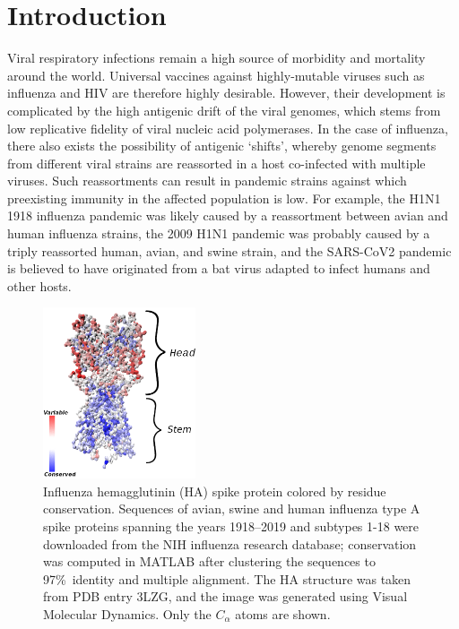 \documentclass[utf8]{frontiersHLTH}%
\newcommand{\cred}[1]{\textsf{\color{red}#1}}
\begin{document}
\section{Introduction}
\label{sec:introduction}
Viral respiratory infections remain a high source of morbidity and
mortality around the world. Universal vaccines against highly-mutable
viruses such as influenza and HIV are therefore highly desirable.
However, their development is complicated by the high antigenic drift of
the viral genomes, which stems from low replicative fidelity of viral
nucleic acid polymerases.  In the case of influenza, there also exists the possibility of antigenic `shifts',
whereby genome segments from different viral strains are
reassorted in a host co-infected with multiple viruses.
Such reassortments can result in pandemic strains against which preexisting immunity
in the affected population is low.
For example, the H1N1 1918 influenza pandemic was likely caused by a reassortment
between avian and human influenza strains, the 2009 H1N1 pandemic was probably
caused by a triply reassorted human, avian, and swine strain,\cite{taubenberger19} and the
SARS-CoV2 pandemic is believed to have originated from a bat virus adapted
to infect humans and other hosts.\cite{andersen20}

\begin{figure}
\centering
\includegraphics[width=0.4\textwidth]{cons3j.png}
\caption{
Influenza hemagglutinin (HA) spike protein colored by residue conservation. Sequences of avian, swine and human influenza type A 
spike proteins \cred{spanning the years 1918--2019 and subtypes 1-18}
were downloaded from the NIH influenza research database\cite{bao08}; conservation was computed in MATLAB\cite{matlab} after
clustering the sequences to 97\%~identity and multiple alignment. The HA structure was taken from PDB entry 3LZG\cite{xu10}, and the image was generated
using Visual Molecular Dynamics.\cite{Humphrey96} Only the $C_\alpha$ atoms are shown.
}
\label{fig:cons}
\end{figure}
\end{document}
